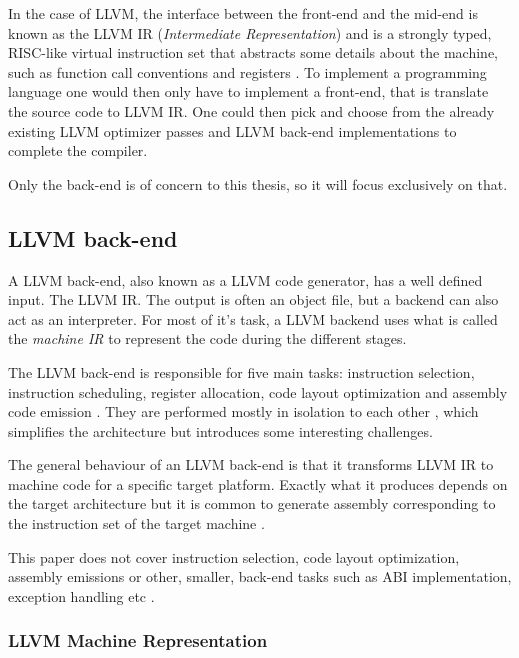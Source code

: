 In the case of LLVM, the interface between the front-end and the mid-end is known as the
LLVM IR (\textit{Intermediate Representation}) and is a strongly typed, RISC-like virtual
instruction set that abstracts some details about the machine, such as function call
conventions and registers \cite[Section~11.3]{aosa-llvm}. To implement a programming language
one would then only have to implement a front-end, that is translate the source code to
LLVM IR. One could then pick and choose from the already existing LLVM optimizer passes
and LLVM back-end implementations to complete the compiler\cite[Section~11.5]{aosa-llvm}.

Only the back-end is of concern to this thesis, so it will focus exclusively on that.

\subsection{LLVM back-end}

A LLVM back-end, also known as a LLVM code generator, has a well defined input. The
LLVM IR\cite[Section~11.4.1]{aosa-llvm}. The output is often an object file, but a backend
can also act as an interpreter. For most of it's task, a LLVM backend uses what is called
the \textit{machine IR} to represent the code during the different stages.

The LLVM back-end is responsible for five main tasks: instruction selection, instruction
scheduling, register allocation, code layout optimization and assembly code emission
\cite{llvm-writing-backend, llvm-codegenerator-highlevel, aosa-llvm}. They are performed
mostly in isolation to each other \cite[Section~11.5]{aosa-llvm}, which simplifies the
architecture but introduces some interesting challenges.

The general behaviour of an LLVM back-end is that it transforms LLVM IR to machine code
for a specific target platform. Exactly what it produces depends on the target architecture
but it is common to generate assembly corresponding to the instruction set of the target
machine \cite[Section~11.5]{aosa-llvm}.

This paper does not cover instruction selection, code layout optimization, assembly emissions
or other, smaller, back-end tasks such as ABI implementation, exception handling etc
\cite[at~1:47]{welcome-to-backend}.

\subsubsection{LLVM Machine Representation}

